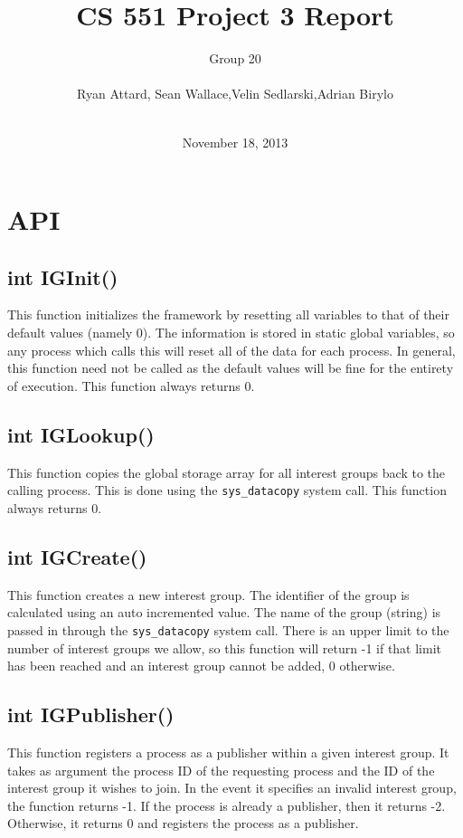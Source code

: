 \documentclass{article}
\title{CS 551 Project 3 Report}
\author{Group 20 \\\\ Ryan Attard, Sean Wallace,Velin Sedlarski,Adrian Birylo\\\\}
\date{November 18, 2013}
\begin{document}
\maketitle
\pagebreak 
\section{API}

\subsection{int IGInit()}
This function initializes the framework by resetting all variables to that of their default values (namely 0).  The information is stored in static global variables, so any process which calls this will reset all of the data for each process.  In general, this function need not be called as the default values will be fine for the entirety of execution.  This function always returns 0.

\subsection{int IGLookup()}
This function copies the global storage array for all interest groups back to the calling process.  This is done using the \verb+sys_datacopy+ system call.  This function always returns 0.

\subsection{int IGCreate()}
This function creates a new interest group.  The identifier of the group is calculated using an auto incremented value.  The name of the group (string) is passed in through the \verb+sys_datacopy+ system call.  There is an upper limit to the number of interest groups we allow, so this function will return -1 if that limit has been reached and an interest group cannot be added, 0 otherwise.

\subsection{int IGPublisher()}
This function registers a process as a publisher within a given interest group.  It takes as argument the process ID of the requesting process and the ID of the interest group it wishes to join.  In the event it specifies an invalid interest group, the function returns -1.  If the process is already a publisher, then it returns -2.  Otherwise, it returns 0 and registers the process as a publisher.
\end{document}
